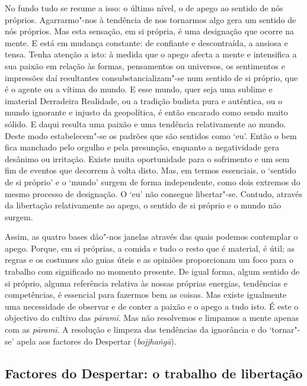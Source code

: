 No fundo tudo se resume a isso: o último nível, o de apego ao sentido de nós
próprios. Agarrarmo"-nos à tendência de nos tornarmos algo gera um sentido de
nós próprios. Mas esta sensação, em si própria, é uma designação que ocorre na
mente. E está em mudança constante: de confiante e descontraída, a ansiosa e
tensa. Tenha atenção a isto: à medida que o apego afecta a mente e intensifica a
sua paixão em relação às formas, pensamentos ou universos, os sentimentos e
impressões daí resultantes consubstancializam"-se num sentido de si próprio, que
é o agente ou a vítima do mundo. E esse mundo, quer seja uma sublime e imaterial
Derradeira Realidade, ou a tradição budista pura e autêntica, ou o mundo
ignorante e injusto da geopolítica, é então encarado como sendo muito sólido. E
daqui resulta uma paixão e uma tendência relativamente ao mundo. Deste modo
estabelecem"-se os padrões que são sentidos como `eu'. Então o bem fica manchado
pelo orgulho e pela presunção, enquanto a negatividade gera desânimo ou
irritação. Existe muita oportunidade para o sofrimento e um sem fim de eventos
que decorrem à volta disto. Mas, em termos essenciais, o `sentido de si próprio'
e o `mundo' surgem de forma independente, como dois extremos do mesmo processo
de designação. O `eu' não consegue libertar"-se. Contudo, através da libertação
relativamente ao apego, o sentido de si próprio e o mundo não surgem.

Assim, as quatro bases dão"-nos janelas através das quais podemos contemplar o
apego. Porque, em si próprias, a comida e tudo o resto que é material, é útil;
as regras e os costumes são guias úteis e as opiniões proporcionam um foco para
o trabalho com significado no momento presente. De igual forma, algum sentido de
si próprio, alguma referência relativa às nossas próprias energias, tendências e
competências, é essencial para fazermos bem as coisas. Mas existe igualmente uma
necessidade de observar e de conter a paixão e o apego a tudo isto. É este o
objectivo do cultivo das \emph{pāramī}. Mas não resolvemos e limpamos a mente
apenas com as \emph{pāramī}. A resolução e limpeza das tendências da ignorância
e do `tornar"-se' apela aos factores do Despertar (\emph{bojjhaṅgā}).

\subsection{Factores do Despertar: o trabalho de libertação}

